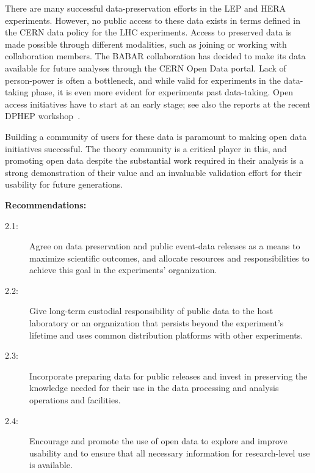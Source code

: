 \documentclass[11pt]{article}
\begin{document}

There are many successful data-preservation efforts in the \gls{LEP} and \gls{HERA} experiments. However, no public access to these data exists in terms defined in the \gls{CERN} data policy for the \gls{LHC} experiments. Access to preserved data is made possible through different modalities, such as joining or working with collaboration members. The \gls{BABAR} collaboration has decided to make its data available for future analyses through the \gls{CERN} Open Data portal. Lack of person-power is often a bottleneck, and while valid for experiments in the data-taking phase, it is even more evident for experiments past data-taking. Open access initiatives have to start at an early stage; see also the reports at the recent DPHEP workshop~\cite{DPHEPws:2021}.

Building a community of users for these data is paramount to making open data initiatives successful. The theory community is a critical player in this, and promoting open data despite the substantial work required in their analysis is a strong demonstration of their value and an invaluable validation effort for their usability for future generations.

\noindent
\textbf{Recommendations:}
\begin{description}
   \item[2.1:] Agree on \gls{data preservation} and public event-data releases as a means to maximize scientific outcomes, and allocate resources and responsibilities to achieve this goal in the experiments' organization.    \item[2.2:] Give long-term custodial responsibility of public \gls{data} to the host laboratory or an organization that persists beyond the experiment's lifetime and uses common distribution platforms with other experiments.
   \item[2.3:] Incorporate preparing \gls{data} for public releases and invest in preserving the knowledge needed for their use in the data processing and analysis operations and facilities.
   \item[2.4:] Encourage and promote the use of open data to explore and improve usability and to ensure that all necessary information for research-level use is available.
\end{description}
\end{document}
